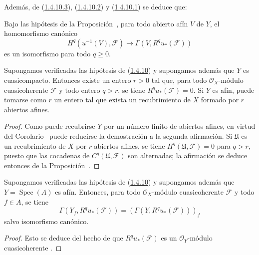 Además, de (\hyperref[III.1.4.10.3]{1.4.10.3}), (\hyperref[III.1.4.10.2]{1.4.10.2}) y (\hyperref[III.1.4.10.1]{1.4.10.1}) se deduce que:
\begin{corollary}[1.4.11]
\label{III.1.4.11}
\label{III.1.4.11-fr}
Bajo las hipótesis de la Proposición~\textup{}, para todo abierto afín $V$ de $Y$, el homomorfismo canónico
\begin{equation}
\label{III.1.4.11.1-fr}
\tag{1.4.11.1}
H^q(u^{-1}(V),\mathcal F)\longrightarrow
\Gamma(V,R^qu_*(\mathcal F))
\end{equation}
es un isomorfismo para todo $q\geq0$.
\end{corollary}

\begin{corollary}[1.4.12]
\label{III.1.4.12-fr}
Supongamos verificadas las hipótesis de \textup{(\hyperref[III.1.4.10-fr]{1.4.10})} y supongamos además que $Y$ es cuasicompacto.
Entonces existe un entero $r>0$ tal que, para todo $\mathcal O_X$-módulo cuasicoherente $\mathcal F$ y todo entero $q>r$, se tiene $R^qu_*(\mathcal F)=0$.
Si $Y$ es afín, puede tomarse como $r$ un entero tal que exista un recubrimiento de $X$ formado por $r$ abiertos afines.
\end{corollary}

\begin{proof}
Como puede recubrirse $Y$ por un número finito de abiertos afines, en virtud del Corolario~ puede reducirse la demostración a la segunda afirmación.
Si $\mathfrak U$ es un recubrimiento de $X$ por $r$ abiertos afines, se tiene $H^q(\mathfrak U,\mathcal F)=0$ para $q>r$, puesto que las cocadenas de $C^q(\mathfrak U,\mathcal F)$ son alternadas; la afirmación se deduce entonces de la Proposición~.
\end{proof}

\begin{corollary}[1.4.13]
\label{III.1.4.13-fr}
Supongamos verificadas las hipótesis de \textup{(\hyperref[III.1.4.10-fr]{1.4.10})} y supongamos además que $Y=\operatorname{Spec}(A)$ es afín.
Entonces, para todo $\mathcal O_X$-módulo cuasicoherente $\mathcal F$ y todo $f\in A$, se tiene
\[
\Gamma(Y_f,R^qu_*(\mathcal F))
=(\Gamma(Y,R^qu_*(\mathcal F)))_f
\]
salvo isomorfismo canónico.
\end{corollary}

\begin{proof}
Esto se deduce del hecho de que $R^qu_*(\mathcal F)$ es un $\mathcal O_Y$-módulo cuasicoherente .
\end{proof}

